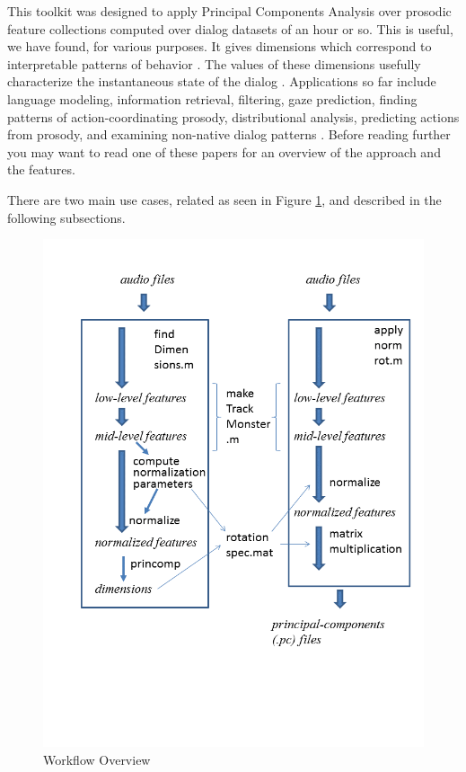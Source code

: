 \documentclass[11pt]{article}
\begin{document}
This toolkit was designed to apply Principal Components Analysis over
prosodic feature collections computed over dialog datasets of an hour
or so.  This is useful, we have found, for various purposes.  It gives
dimensions which correspond to interpretable patterns of behavior
\cite{prosodic-elements}.  The values of these dimensions usefully
characterize the instantaneous state of the dialog
\cite{dialog-dimensions}.  Applications so far include language
modeling, information retrieval, filtering, gaze prediction, finding
patterns of action-coordinating prosody, distributional analysis,
predicting actions from prosody, and examining non-native dialog
patterns
\cite{pca-lm,prosody-ir,sigdial-codec,ward-gaze,ward-abu,dimensions-uh-huh,l2english,me-mandarin,ward-stance}.
Before reading further you may want to read one of these papers for an
overview of the approach and the features.

There are two main use cases, related as seen in Figure \ref{diagram},
and described in the following subsections.

\begin{figure}[thp]
 \centerline{ 
 \includegraphics[width=11.4cm, trim = 0.cm 4.3cm 0cm 1.5cm, clip=true]{workflow-overview}
}
\caption{Workflow Overview}
\label{diagram}
\end{figure}
\end{document}
